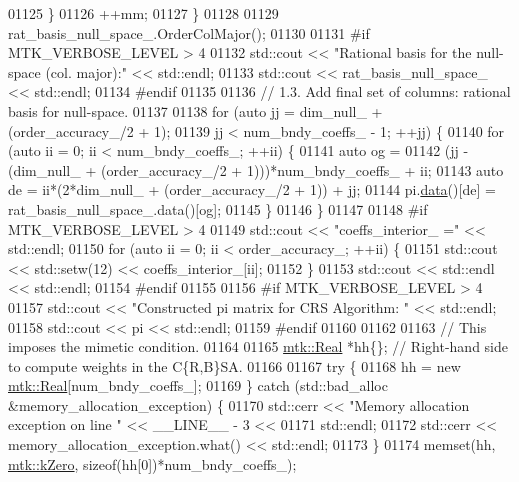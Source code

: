 \begin{DoxyCode}
{{01125     \}
01126     ++mm;
01127   \}
01128 
01129   rat\_basis\_null\_space\_.OrderColMajor();
01130 
01131 \textcolor{preprocessor}{  #if MTK\_VERBOSE\_LEVEL > 4}
01132   std::cout << \textcolor{stringliteral}{"Rational basis for the null-space (col. major):"} << std::endl;
01133   std::cout << rat\_basis\_null\_space\_ << std::endl;
01134 \textcolor{preprocessor}{  #endif}
01135 
01136   \textcolor{comment}{// 1.3. Add final set of columns: rational basis for null-space.}
01137 
01138   \textcolor{keywordflow}{for} (\textcolor{keyword}{auto} jj = dim\_null\_ + (order\_accuracy\_/2 + 1);
01139        jj < num\_bndy\_coeffs\_ - 1; ++jj) \{
01140     \textcolor{keywordflow}{for} (\textcolor{keyword}{auto} ii = 0; ii < num\_bndy\_coeffs\_; ++ii) \{
01141       \textcolor{keyword}{auto} og =
01142         (jj - (dim\_null\_ + (order\_accuracy\_/2 + 1)))*num\_bndy\_coeffs\_ + ii;
01143       \textcolor{keyword}{auto} de = ii*(2*dim\_null\_ + (order\_accuracy\_/2 + 1)) + jj;
01144       pi.\hyperlink{classmtk_1_1DenseMatrix_a0c33b8a9e01d157c61ddbdf807c25d84}{data}()[de] = rat\_basis\_null\_space\_.data()[og];
01145     \}
01146   \}
01147 
01148 \textcolor{preprocessor}{  #if MTK\_VERBOSE\_LEVEL > 4}
01149   std::cout << \textcolor{stringliteral}{"coeffs\_interior\_ ="} << std::endl;
01150   \textcolor{keywordflow}{for} (\textcolor{keyword}{auto} ii = 0; ii < order\_accuracy\_; ++ii) \{
01151     std::cout << std::setw(12) << coeffs\_interior\_[ii];
01152   \}
01153   std::cout << std::endl << std::endl;
01154 \textcolor{preprocessor}{  #endif}
01155 
01156 \textcolor{preprocessor}{  #if MTK\_VERBOSE\_LEVEL > 4}
01157   std::cout << \textcolor{stringliteral}{"Constructed pi matrix for CRS Algorithm: "} << std::endl;
01158   std::cout << pi << std::endl;
01159 \textcolor{preprocessor}{  #endif}
01160 
01162 
01163   \textcolor{comment}{// This imposes the mimetic condition.}
01164 
01165   \hyperlink{group__c01-roots_gac080bbbf5cbb5502c9f00405f894857d}{mtk::Real} *hh\{\};  \textcolor{comment}{// Right-hand side to compute weights in the C\{R,B\}SA.}
01166 
01167   \textcolor{keywordflow}{try} \{
01168     hh = \textcolor{keyword}{new} \hyperlink{group__c01-roots_gac080bbbf5cbb5502c9f00405f894857d}{mtk::Real}[num\_bndy\_coeffs\_];
01169   \} \textcolor{keywordflow}{catch} (std::bad\_alloc &memory\_allocation\_exception) \{
01170     std::cerr << \textcolor{stringliteral}{"Memory allocation exception on line "} << \_\_LINE\_\_ - 3 <<
01171       std::endl;
01172     std::cerr << memory\_allocation\_exception.what() << std::endl;
01173   \}
01174   memset(hh, \hyperlink{group__c01-roots_ga59a451a5fae30d59649bcda274fea271}{mtk::kZero}, \textcolor{keyword}{sizeof}(hh[0])*num\_bndy\_coeffs\_);
}}
\end{DoxyCode}
